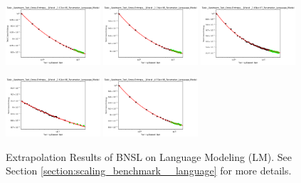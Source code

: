 \documentclass{article} %
\begin{document}
\vspace{5.95mm}


\begin{figure}[]
    \centering

\includegraphics[width=0.3125\textwidth]{figures/scaling_laws_benchmark_dataset_plots/validation_loss___1.07e+09.png}
\includegraphics[width=0.3125\textwidth]{figures/scaling_laws_benchmark_dataset_plots/validation_loss___1.34e+08.png}
\includegraphics[width=0.3125\textwidth]{figures/scaling_laws_benchmark_dataset_plots/validation_loss___1.68e+07.png}

\vspace{-0.1mm}

\includegraphics[width=0.3125\textwidth]{figures/scaling_laws_benchmark_dataset_plots/validation_loss___2.62e+08.png}
\includegraphics[width=0.3125\textwidth]{figures/scaling_laws_benchmark_dataset_plots/validation_loss___4.53e+08.png}
\vspace{-4.2mm}
    \caption{
    Extrapolation Results of BNSL on Language Modeling (LM). See Section \ref{section:scaling_benchmark__language} for more details.
    }
    \label{fig:scaling_laws_benchmark_dataset__language_modeling}
\end{figure}
\end{document}
